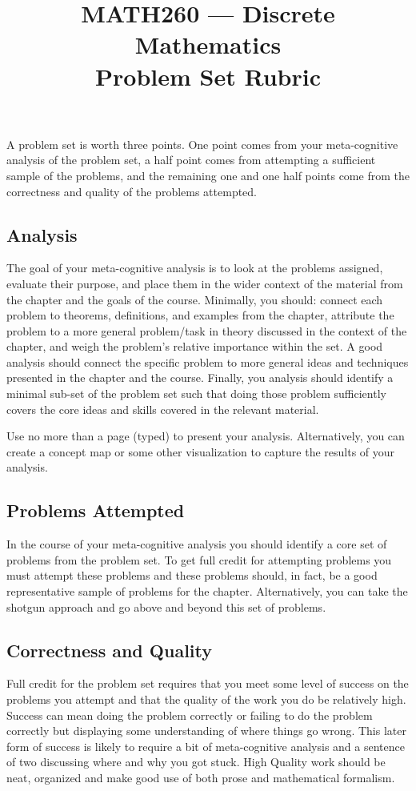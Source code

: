 \documentclass[nobib]{tufte-handout}
\title{MATH260 --- Discrete Mathematics \\  Problem Set Rubric}
\begin{document}
\maketitle

A problem set is worth three points.  One point comes from your meta-cognitive analysis of the problem set, a half point  comes from attempting a sufficient sample of the problems, and the remaining one and one half points come from the correctness and quality of the problems attempted.

\subsection*{Analysis}

The goal of your meta-cognitive analysis is to look at the problems assigned, evaluate their purpose, and place them in the wider context of the material from the chapter and the goals of the course. Minimally, you should: connect each problem to theorems, definitions, and examples from the chapter, attribute the problem to a more general problem/task in theory discussed in the context of the chapter, and weigh the problem's relative importance within the set. A good analysis should connect the specific problem to more general ideas and techniques presented in the chapter and the course. Finally, you analysis should identify a minimal sub-set of the problem set such that doing those problem sufficiently covers the core ideas and skills covered in the relevant material.

Use no more than a page (typed) to present your analysis. Alternatively, you can create a concept map or some other visualization to capture the results of your analysis.

\subsection*{Problems Attempted}

In the course of your meta-cognitive analysis you should identify a core set of problems from the problem set.  To get full credit for attempting problems you must attempt these problems and these problems should, in fact, be a good representative sample of problems for the chapter. Alternatively, you can take the shotgun approach and go above and beyond this set of problems.

\subsection*{Correctness and Quality}

Full credit for the problem set requires that you meet some level of success on the problems you attempt and that the quality of the work you do be relatively high. Success can mean doing the problem correctly or failing to do the problem correctly but displaying some understanding of where things go wrong.  This later form of success is likely to require a bit of meta-cognitive analysis and a sentence of two discussing where and why you got stuck. High Quality work should be neat, organized and make good use of both prose and mathematical formalism.
\end{document}
